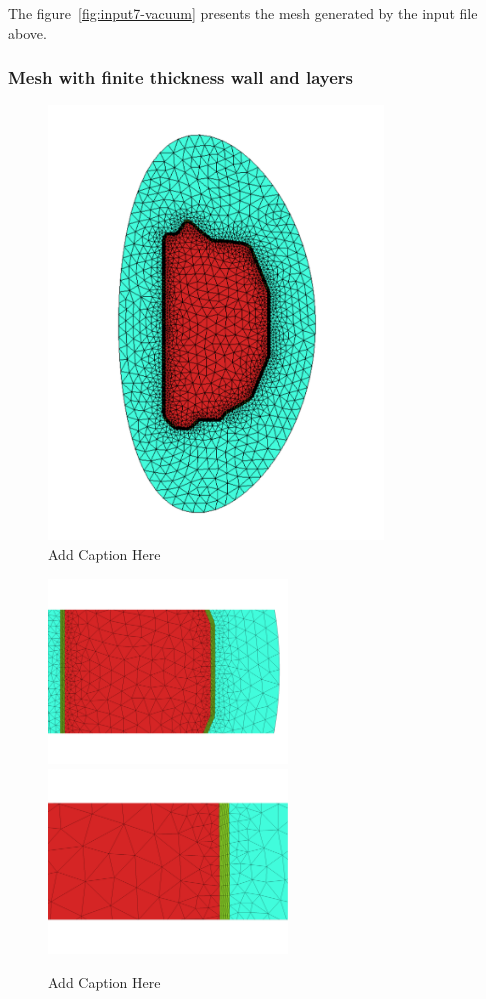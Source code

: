 The figure~\ref{fig:input7-vacuum} presents the mesh generated by the input file above.

\subsubsection{Mesh with finite thickness wall and layers}

\begin{figure}
\centering
\includegraphics[width=3.5in]{./figures/FiniteThicknessWall-full.pdf}
\caption
{Add Caption Here}
\label{fig:thickness-full}
\end{figure}

\begin{figure}
\centering
\includegraphics[width=2.5in]{./figures/FiniteThicknessWall-zoom1.pdf}
\includegraphics[width=2.5in]{./figures/FiniteThicknessWall-zoom2.pdf}
\caption
{Add Caption Here}
\label{fig:thickness-zoom}
\end{figure}

